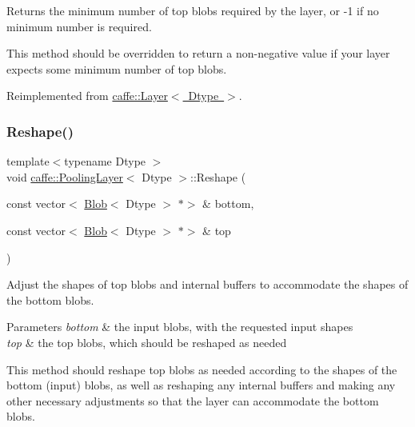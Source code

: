 Returns the minimum number of top blobs required by the layer, or -\/1 if no minimum number is required. 

This method should be overridden to return a non-\/negative value if your layer expects some minimum number of top blobs. 

Reimplemented from \mbox{\hyperlink{classcaffe_1_1_layer_ab9e4c8d642e413948b131d851a8462a4}{caffe\+::\+Layer$<$ Dtype $>$}}.

\mbox{\label{classcaffe_1_1_pooling_layer_ac652e08deffb0eeb6c3113abb55eb641}} 
\subsubsection{\texorpdfstring{Reshape()}{Reshape()}\hspace{0.1cm}{\footnotesize\ttfamily [1/2]}}
{\footnotesize\ttfamily template$<$typename Dtype $>$ \\
void \mbox{\hyperlink{classcaffe_1_1_pooling_layer}{caffe\+::\+Pooling\+Layer}}$<$ Dtype $>$\+::Reshape (\begin{DoxyParamCaption}\item[{const vector$<$ \mbox{\hyperlink{classcaffe_1_1_blob}{Blob}}$<$ Dtype $>$ $\ast$$>$ \&}]{bottom,  }\item[{const vector$<$ \mbox{\hyperlink{classcaffe_1_1_blob}{Blob}}$<$ Dtype $>$ $\ast$$>$ \&}]{top }\end{DoxyParamCaption})\hspace{0.3cm}{\ttfamily [virtual]}}



Adjust the shapes of top blobs and internal buffers to accommodate the shapes of the bottom blobs. 


\begin{DoxyParams}{Parameters}
{\em bottom} & the input blobs, with the requested input shapes \\
\hline
{\em top} & the top blobs, which should be reshaped as needed\\
\hline
\end{DoxyParams}
This method should reshape top blobs as needed according to the shapes of the bottom (input) blobs, as well as reshaping any internal buffers and making any other necessary adjustments so that the layer can accommodate the bottom blobs. 

